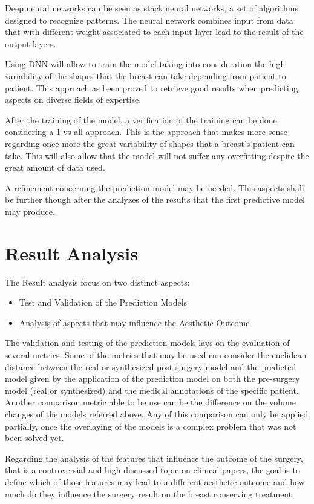 Deep neural networks can be seen as stack neural networks, a set of algorithms designed to recognize patterns. The neural network combines input from data that with different weight associated to each input layer lead to the result of the output layers.

Using DNN will allow to train the model taking into consideration the high variability of the shapes that the breast can take depending from patient to patient. This approach as been proved to retrieve good results when predicting aspects on diverse fields of expertise.

After the training of the model, a verification of the training can be done considering a 1-vs-all approach. This is the approach that makes more sense regarding once more the great variability of shapes that a breast's patient can take. This will also allow that the model will not suffer any overfitting despite the great amount of data used.

A refinement concerning the prediction model may be needed. This aspects shall be further though after the analyzes of the results that the first predictive model may produce.


\section{Result Analysis}

The Result analysis focus on two distinct aspects:

\begin{itemize}
\item Test and Validation of the Prediction Models
\item Analysis of aspects that may influence the Aesthetic Outcome
\end{itemize}

The validation and testing of the prediction models lays on the evaluation of several metrics. Some of the metrics that may be used can consider the euclidean distance between the real or synthesized post-surgery model and the predicted model given by the application of the prediction model on both the pre-surgery model (real or synthesized) and the medical annotations of the specific patient. Another comparison metric able to be use can be the difference on the volume changes of the models referred above. Any of this comparison can only be applied partially, once the overlaying of the models is a complex problem that was not been solved yet. 

Regarding the analysis of the features that influence the outcome of the surgery, that is a controversial and high discussed topic on clinical papers, the goal is to define which of those features may lead to a different aesthetic outcome and how much do they influence the surgery result on the breast conserving treatment.

